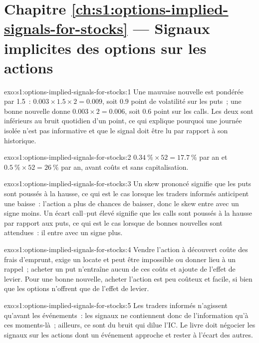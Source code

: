 \section*{Chapitre \ref{ch:s1:options-implied-signals-for-stocks} --- Signaux implicites des options sur les actions}

\begin{solution}{exo:s1:options-implied-signals-for-stocks:1}
Une mauvaise nouvelle est pondérée par 1.5~: $0.003 \times 1.5 \times 2 = 0.009$, soit 0.9 point de volatilité sur les puts~; une bonne nouvelle donne $0.003 \times 2 = 0.006$, soit 0.6 point sur les calls. Les deux
sont inférieurs au bruit quotidien d'un point, ce qui explique pourquoi une journée isolée n'est pas informative et que le signal doit être lu par rapport à son historique.
\end{solution}

\begin{solution}{exo:s1:options-implied-signals-for-stocks:2}
$0.34~\% \times 52 = 17.7~\%$ par an et $0.5~\% \times 52 = 26~\%$ par an, avant coûts et sans capitalisation.
\end{solution}

\begin{solution}{exo:s1:options-implied-signals-for-stocks:3}
Un skew prononcé signifie que les puts sont poussés à la hausse, ce qui est le cas lorsque les traders informés anticipent une baisse~: l'action a plus de chances de baisser, donc le skew entre avec un signe moins. Un
écart call--put élevé signifie que les calls sont poussés à la hausse par rapport aux puts, ce qui est le cas lorsque de bonnes nouvelles sont attendues~: il entre avec un signe plus.
\end{solution}

\begin{solution}{exo:s1:options-implied-signals-for-stocks:4}
Vendre l'action à découvert coûte des frais d'emprunt, exige un locate et peut être impossible ou donner lieu à un rappel~; acheter un put n'entraîne aucun de ces coûts et ajoute de l'effet de levier. Pour une bonne
nouvelle, acheter l'action est peu coûteux et facile, si bien que les options n'offrent que de l'effet de levier.
\end{solution}

\begin{solution}{exo:s1:options-implied-signals-for-stocks:5}
Les traders informés n'agissent qu'avant les événements~: les signaux ne contiennent donc de l'information qu'à ces moments-là~; ailleurs, ce sont du bruit qui dilue l'IC. Le livre doit
négocier les signaux sur les actions dont un événement approche et rester à l'écart des autres.
\end{solution}

